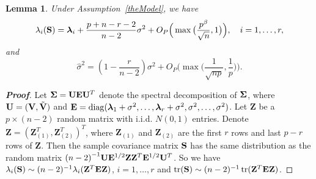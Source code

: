 \documentclass[review]{elsarticle}
\DeclareMathOperator{\mytr}{tr}
\DeclareMathOperator{\mydiag}{diag}
\newcommand{\bZ}{\mathbf{Z}}
\newcommand{\bfsym}[1]{\ensuremath{\boldsymbol{#1}}}
\def\blambda {\bfsym {\lambda}}        \def\bLambda {\bfsym {\Lambda}}
\theoremstyle{plain}
\newtheorem{lemma}{\quad\quad Lemma}
\theoremstyle{definition}
\theoremstyle{remark}
\begin{document}
\begin{appendices}
\begin{lemma}\label{eigenconsisLemma}
    Under Assumption~\ref{theModel}, we have
    \begin{equation}\label{eigenconsisResult1}
        \lambda_i(\BS)= \blambda_i+\frac{p+n-r-2}{n-2}\sigma^2+
        O_P\Big(\max\big(\frac{p^{\beta}}{\sqrt{n}},1\big)\Big),\quad i=1,\ldots, r,
    \end{equation}
    and
    \begin{equation}\label{eigenconsisResult2}
        \hat{\sigma}^2=
(1-\frac{r}{n-2})\sigma^2+
O_P\Big(\max\big(\frac{1}{\sqrt{np}},\frac{1}{p}\big)\Big).
    \end{equation}
\end{lemma}
\begin{proof}[\textbf{Proof}]
    Let $\bSigma=\BU\BE\BU^T$ denote the spectral decomposition of $\bSigma$, where
     $\mathbf{U}=(\mathbf{V},\tilde{\mathbf{V}})$ and $\BE=\mydiag(\blambda_1+\sigma^2,\ldots,\blambda_r+\sigma^2,\sigma^2,\ldots,\sigma^2)$.
Let $\bZ$ be a $p\times (n-2)$ random matrix with i.i.d. $N(0,1)$ entries.
Denote $\bZ={(\bZ_{(1)}^T,\bZ_{(2)}^T)}^T$, where $\bZ_{(1)}$ and $\bZ_{(2)}$ are the first $r$ rows and last $p-r$ rows of $\bZ$. 
Then the sample covariance matrix $\mathbf{S}$ has the same distribution as the random matrix
$
    {(n-2)}^{-1} \BU \BE^{1/2} \bZ \bZ^T \BE^{1/2} \BU^T
$.
    So we have $\lambda_i(\BS)\sim (n-2)^{-1}\lambda_i(\bZ^T \BE \bZ)$, $i=1,\ldots,r$ and $\mytr(\BS)\sim (n-2)^{-1}\mytr(\BZ^T \BE \BZ)$.


\end{proof}
\end{appendices}
\end{document}
